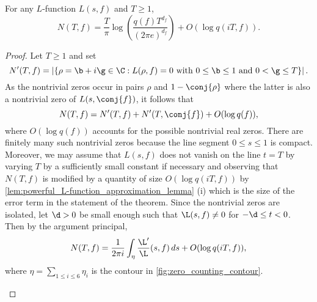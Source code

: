     \begin{theorem}
      For any $L$-function $L(s,f)$ and $T \ge 1$,
      \[
        N(T,f) = \frac{T}{\pi}\log\left(\frac{q(f)T^{d_{f}}}{(2\pi e)^{d_{f}}}\right)+O(\log{q(iT,f)}).
      \]
    \end{theorem}
    \begin{proof}
      Let $T \ge 1$ and set
      \[
      N'(T,f) = \left|\{\rho = \b+i\g \in \C:L(\rho,f) = 0 \text{ with } 0 \le \b \le 1 \text{ and } 0 < \g \le T\}\right|.
    \]
    As the nontrivial zeros occur in pairs $\rho$ and $1-\conj{\rho}$ where the latter is also a nontrivial zero of $L(s,\conj{f})$, it follows that
    \[
      N(T,f) = N'(T,f)+N'(T,\conj{f})+O(\log{q(f)}),
    \]
    where $O(\log{q(f)})$ accounts for the possible nontrivial real zeros. There are finitely many such nontrivial zeros because the line segment $0 \le s \le 1$ is compact. Moreover, we may assume that $L(s,f)$ does not vanish on the line $t = T$ by varying $T$ by a sufficiently small constant if necessary and observing that $N(T,f)$ is modified by a quantity of size $O(\log{q}(iT,f))$ by \cref{lem:powerful_L-function_approximation_lemma} (i) which is the size of the error term in the statement of the theorem. Since the nontrivial zeros are isolated, let $\d > 0$ be small enough such that $\L(s,f) \neq 0$ for $-\d \le t < 0$. Then by the argument principal,
    \[
      N(T,f) = \frac{1}{2\pi i}\int_{\eta}\frac{\L'}{\L}(s,f)\,ds+O(\log{q}(iT,f)),
    \]
    where $\eta = \sum_{1 \le i \le 6}\eta_{i}$ is the contour in \cref{fig:zero_counting_contour}.

    \begin{figure}[ht]
          \centering
\end{figure}
\end{proof}
